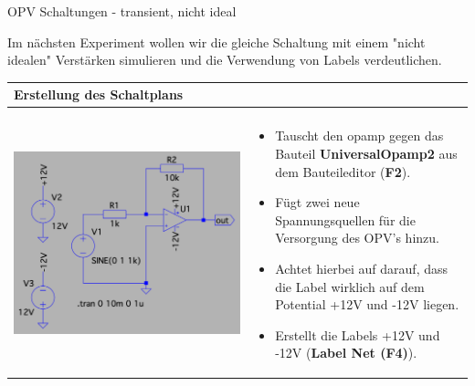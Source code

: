 \begin{frame}[t]{OPV Schaltungen - transient, nicht ideal}

  \begin{spacing}{0.6} \begin{tiny}
      Im nächsten Experiment wollen wir die gleiche Schaltung mit einem "nicht idealen" Verstärken simulieren und die Verwendung
      von Labels verdeutlichen.
    \end{tiny} \end{spacing}

  \begin{spacing}{0.9} \begin{tiny}
      \begin{table}[h!]
        \begin{tabular}{p{3cm} p{7cm}}
          \hline
          \textbf{Erstellung des Schaltplans} & \\
          \hline                                \\
          \begin{minipage}{.3\textwidth}
            \includegraphics[width=0.8\linewidth]{pictures/opamp_2.png}
          \end{minipage}
                                              &
          \begin{minipage}{.7\textwidth}
            \begin{itemize}
              \item Tauscht den opamp gegen das Bauteil \textbf{UniversalOpamp2} aus dem Bauteileditor (\textbf{F2}).
              \item Fügt zwei neue Spannungsquellen für die Versorgung des OPV's hinzu.
              \item Achtet hierbei auf darauf, dass die Label wirklich auf dem Potential +12V und -12V liegen.
              \item Erstellt die Labels +12V und -12V (\textbf{Label Net (F4)}).
            \end{itemize}
          \end{minipage}
          \\
        \end{tabular}


\end{table}
\end{tiny}
\end{spacing}
\end{frame}
